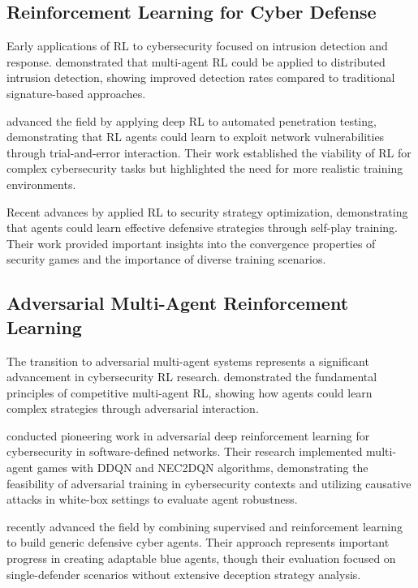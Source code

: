 \subsection{Reinforcement Learning for Cyber Defense}

Early applications of RL to cybersecurity focused on intrusion detection and response. \citet{malialis2015distributed} demonstrated that multi-agent RL could be applied to distributed intrusion detection, showing improved detection rates compared to traditional signature-based approaches.

\citet{hu2020automated} advanced the field by applying deep RL to automated penetration testing, demonstrating that RL agents could learn to exploit network vulnerabilities through trial-and-error interaction. Their work established the viability of RL for complex cybersecurity tasks but highlighted the need for more realistic training environments.

Recent advances by \citet{hammar2020finding} applied RL to security strategy optimization, demonstrating that agents could learn effective defensive strategies through self-play training. Their work provided important insights into the convergence properties of security games and the importance of diverse training scenarios.

\subsection{Adversarial Multi-Agent Reinforcement Learning}

The transition to adversarial multi-agent systems represents a significant advancement in cybersecurity RL research. \citet{tampuu2017multiagent} demonstrated the fundamental principles of competitive multi-agent RL, showing how agents could learn complex strategies through adversarial interaction.

\citet{borchjes2023adversarial} conducted pioneering work in adversarial deep reinforcement learning for cybersecurity in software-defined networks. Their research implemented multi-agent games with DDQN and NEC2DQN algorithms, demonstrating the feasibility of adversarial training in cybersecurity contexts and utilizing causative attacks in white-box settings to evaluate agent robustness.

\citet{farooq2025combining} recently advanced the field by combining supervised and reinforcement learning to build generic defensive cyber agents. Their approach represents important progress in creating adaptable blue agents, though their evaluation focused on single-defender scenarios without extensive deception strategy analysis.

